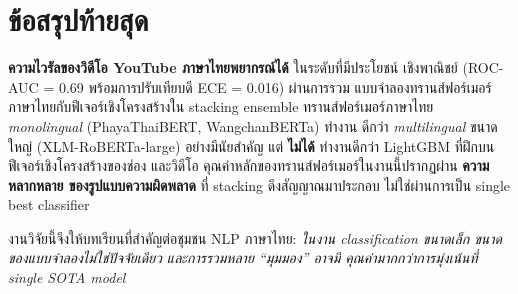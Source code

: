 \section{ข้อสรุปท้ายสุด}
\label{sec:conclusion-final}

\textbf{ความไวรัลของวิดีโอ YouTube ภาษาไทยพยากรณ์ได้} ในระดับที่มีประโยชน์
เชิงพาณิชย์ (ROC-AUC = 0.69 พร้อมการปรับเทียบดี ECE = 0.016) ผ่านการรวม
แบบจำลองทรานส์ฟอร์เมอร์ภาษาไทยกับฟีเจอร์เชิงโครงสร้างใน stacking ensemble
ทรานส์ฟอร์เมอร์ภาษาไทย \emph{monolingual} (PhayaThaiBERT, WangchanBERTa) ทำงาน
ดีกว่า \emph{multilingual} ขนาดใหญ่ (XLM-RoBERTa-large) อย่างมีนัยสำคัญ
แต่ \textbf{ไม่ได้} ทำงานดีกว่า LightGBM ที่ฝึกบนฟีเจอร์เชิงโครงสร้างของช่อง
และวิดีโอ คุณค่าหลักของทรานส์ฟอร์เมอร์ในงานนี้ปรากฏผ่าน \textbf{ความหลากหลาย
ของรูปแบบความผิดพลาด} ที่ stacking ดึงสัญญาณมาประกอบ ไม่ใช่ผ่านการเป็น single
best classifier

งานวิจัยนี้จึงให้บทเรียนที่สำคัญต่อชุมชน NLP ภาษาไทย: \emph{ในงาน classification
ขนาดเล็ก ขนาดของแบบจำลองไม่ใช่ปัจจัยเดียว และการรวมหลาย ``มุมมอง'' อาจมี
คุณค่ามากกว่าการมุ่งเน้นที่ single SOTA model}
